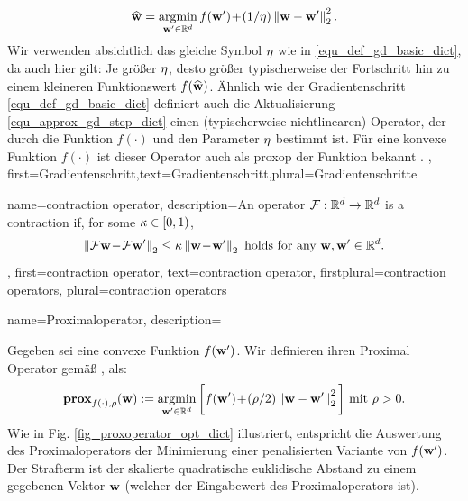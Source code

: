 {{{{{{{		\begin{align} 
			\label{equ_approx_gd_step_dict}
			\widehat{{\bf w}} = \operatorname*{argmin}_{{\bf w}' \in \mathbb{R}^{d}} f({\bf w}')\!+\!(1/\eta)\left\Vert {{\bf w}-{\bf w}'} \right\Vert_{2}^2. 
		\end{align}
		Wir verwenden absichtlich das gleiche Symbol $\eta$ wie in \eqref{equ_def_gd_basic_dict}, 
		da auch hier gilt: Je größer $\eta$, desto größer typischerweise der Fortschritt hin zu 
		einem kleineren Funktionswert $f(\widehat{{\bf w}})$. Ähnlich wie der Gradientenschritt 
		\eqref{equ_def_gd_basic_dict} definiert auch die Aktualisierung \eqref{equ_approx_gd_step_dict} 
		einen (typischerweise nichtlinearen) Operator, der durch die Funktion $f(\cdot)$ und den Parameter 
		$\eta$ bestimmt ist. Für eine \gls{konvexe} Funktion $f(\cdot)$ ist dieser Operator auch als 
		\gls{proxop} der Funktion bekannt \cite{ProximalMethods}.
		},
		first={Gradientenschritt},text={Gradientenschritt},plural={Gradientenschritte}
}

{name={contraction operator},
	description={An operator $\mathcal{F}: \mathbb{R}^{d} \rightarrow \mathbb{R}^{d}$
		is a contraction if, for some $\kappa \in [0,1)$,
		\begin{equation} 
			\nonumber
			\left\Vert { \mathcal{F}{\bf w}\!-\!\mathcal{F}{\bf w}'} \right\Vert_{2}  \leq  \kappa	\left\Vert {{\bf w}\!-\!{\bf w}'} \right\Vert_{2} \mbox{ holds for any } {\bf w},{\bf w}' \in \mathbb{R}^{d}.
		\end{equation}
	},
	first={contraction operator},
	text={contraction operator}, 
	firstplural={contraction operators}, 
	plural={contraction operators}
}


{name={Proximaloperator},
	description={Gegeben sei  eine \gls{convex}e Funktion $f({\bf w}')$. Wir definieren ihren Proximal Operator gemäß \cite{ProximalMethods}, \cite{Bauschke:2017} als: 
		$${\rm\bf prox}_{f(\cdot),\rho}({\bf w}):= \operatorname*{argmin}_{{\bf w}' \in \mathbb{R}^{d}} \bigg[ f({\bf w}')\!+\!(\rho/2) \left\Vert {{\bf w}- {\bf w}'} \right\Vert_{2}^{2}\bigg] \mbox{ mit } \rho > 0. $$ 
		Wie in Fig. \ref{fig_proxoperator_opt_dict}  illustriert, entspricht die Auswertung des Proximaloperators der Minimierung einer penalisierten Variante von $f({\bf w}')$. Der Strafterm ist der skalierte quadratische euklidische Abstand zu einem gegebenen Vektor ${\bf w}$ (welcher der Eingabewert des Proximaloperators ist).
	
}}}}}}}
